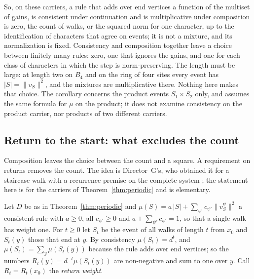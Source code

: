 So, on these carriers, a rule that adds over end vertices a function of the multiset of gains, is consistent under continuation and is multiplicative under composition is zero, the count of walks, or the squared norm for one character, up to the identification of characters that agree on events; it is not a mixture, and its normalization is fixed. Consistency and composition together leave a choice between finitely many rules: zero, one that ignores the gains, and one for each class of characters in which the step is norm-preserving. The length must be large: at length two on $B_4$ and on the ring of four sites every event has $|S|=\lVert v_S\rVert^2$, and the mixtures are multiplicative there. Nothing here makes that choice. The corollary concerns the product events $S_1\times S_2$ only, and assumes the same formula for $\mu$ on the product; it does not examine consistency on the product carrier, nor products of two different carriers.

\subsection{Return to the start: what excludes the count}
Composition leaves the choice between the count and a square. A requirement on returns removes the count. The idea is Director~G's, who obtained it for a staircase walk with a recurrence premise on the complete system \cite{dgret}; the statement here is for the carriers of Theorem~\ref{thm:periodic} and is elementary.

Let $D$ be as in Theorem~\ref{thm:periodic} and $\mu(S)=a\,|S|+\sum_{\psi'}c_{\psi'}\lVert v^\psi_S\rVert^2$ a consistent rule with $a\ge0$, all $c_{\psi'}\ge0$ and $a+\sum_{\psi'}c_{\psi'}=1$, so that a single walk has weight one. For $t\ge0$ let $S_t$ be the event of all walks of length $t$ from $x_0$ and $S_t(y)$ those that end at $y$. By consistency $\mu(S_t)=d^t$, and $\mu(S_t)=\sum_y\mu(S_t(y))$ because the rule adds over end vertices; so the numbers $R_t(y)=d^{-t}\mu(S_t(y))$ are non-negative and sum to one over $y$. Call $R_t=R_t(x_0)$ the \emph{return weight}.

